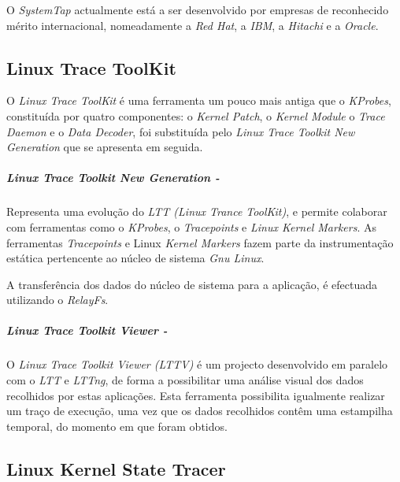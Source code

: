 O \textit{SystemTap} actualmente está a ser desenvolvido por empresas de reconhecido mérito internacional, nomeadamente a \textit{Red Hat}, a \textit{IBM}, a \textit{Hitachi} e a \textit{Oracle}.

\subsection{Linux Trace ToolKit}\label{cap:linux_trace_toolkit_overview}

O \textit{Linux Trace ToolKit} é uma ferramenta um pouco mais antiga que o \textit{KProbes}, constituída por quatro componentes: o \textit{Kernel Patch}, o \textit{Kernel Module} o \textit{Trace Daemon} e o \textit{Data Decoder}, foi substituída pelo \textit{Linux Trace Toolkit New Generation} que se apresenta em seguida.

\subparagraph{Linux Trace Toolkit New Generation - }\label{cap:lttng_overview}


Representa uma evolução do \textit{LTT (Linux Trance ToolKit)}, e permite colaborar com ferramentas como o \textit{KProbes}, o \textit{Tracepoints}\cite{Mathieu2009} e \textit{Linux Kernel Markers}\cite{Mathieu2009}.
As ferramentas \textit{Tracepoints} e Linux \textit{Kernel Markers} fazem parte da instrumentação estática pertencente ao núcleo de sistema \textit{Gnu Linux}.

A transferência dos dados do núcleo de sistema para a aplicação, é efectuada utilizando o \textit{RelayFs}.


\subparagraph{Linux Trace Toolkit Viewer - }\label{cap:lttv_overview}
O \textit{Linux Trace Toolkit Viewer (LTTV)} é um projecto desenvolvido em paralelo com o \textit{LTT} e \textit{LTTng}, de forma a possibilitar uma análise visual dos dados recolhidos por estas aplicações.
Esta ferramenta possibilita igualmente realizar um traço de execução, uma vez que os dados recolhidos contêm uma estampilha temporal, do momento em que foram obtidos.


\subsection{Linux Kernel State Tracer}

